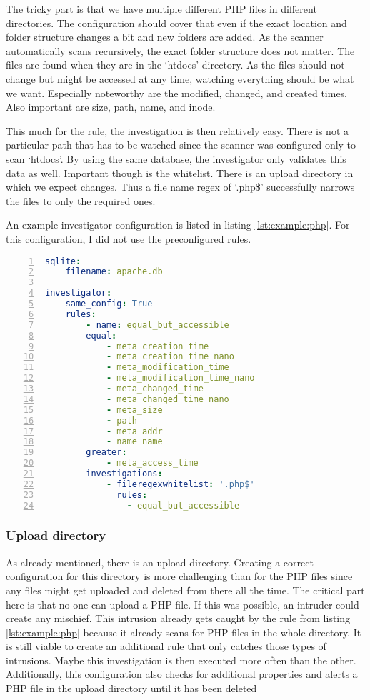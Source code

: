 The tricky part is that we have multiple different PHP files in different directories. The configuration should cover that even if the exact location and folder structure changes a bit and new folders are added. As the scanner automatically scans recursively, the exact folder structure does not matter. The files are found when they are in the `htdocs' directory. As the files should not change but might be accessed at any time, watching everything should be what we want. Especially noteworthy are the modified, changed, and created times. Also important are size, path, name, and inode.

This much for the rule, the investigation is then relatively easy. There is not a particular path that has to be watched since the scanner was configured only to scan `htdocs'. By using the same database, the investigator only validates this data as well. Important though is the whitelist. There is an upload directory in which we expect changes. Thus a file name regex of `.php\$' successfully narrows the files to only the required ones.

An example investigator configuration is listed in listing \ref{lst:example:php}. For this configuration, I did not use the preconfigured rules.


\begin{lstlisting}[language=yaml, numbers=left, caption=Example PHP File Configuration, label=lst:example:php]
sqlite:
    filename: apache.db

investigator:
    same_config: True
    rules: 
        - name: equal_but_accessible
        equal:
            - meta_creation_time
            - meta_creation_time_nano
            - meta_modification_time
            - meta_modification_time_nano
            - meta_changed_time
            - meta_changed_time_nano
            - meta_size
            - path
            - meta_addr
            - name_name
        greater:
            - meta_access_time
        investigations:
            - fileregexwhitelist: '.php$'
              rules:
                - equal_but_accessible
\end{lstlisting}

\subsubsection{Upload directory}

As already mentioned, there is an upload directory. Creating a correct configuration for this directory is more challenging than for the PHP files since any files might get uploaded and deleted from there all the time. The critical part here is that no one can upload a PHP file. If this was possible, an intruder could create any mischief. This \gls{intrusion} already gets caught by the rule from listing \ref{lst:example:php} because it already scans for PHP files in the whole directory. It is still viable to create an additional rule that only catches those types of \glspl{intrusion}. Maybe this investigation is then executed more often than the other. Additionally, this configuration also checks for additional properties and alerts a PHP file in the upload directory until it has been deleted

